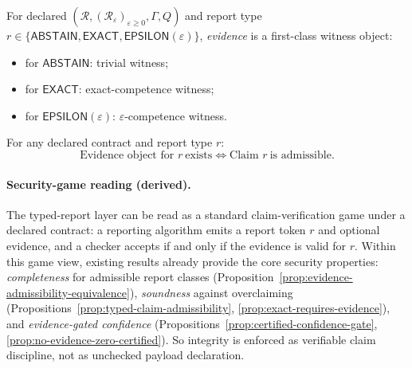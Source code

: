 \begin{definition}\label{def:evidence-object}
For declared $(\mathcal{R},(\mathcal{R}_\varepsilon)_{\varepsilon\ge 0},\Gamma,Q)$ and report type $r\in\{\mathsf{ABSTAIN},\mathsf{EXACT},\mathsf{EPSILON}(\varepsilon)\}$,
\emph{evidence} is a first-class witness object:
\begin{itemize}
\item for $\mathsf{ABSTAIN}$: trivial witness;
\item for $\mathsf{EXACT}$: exact-competence witness;
\item for $\mathsf{EPSILON}(\varepsilon)$: $\varepsilon$-competence witness.
\end{itemize}
\end{definition}

\begin{proposition}\label{prop:evidence-admissibility-equivalence}
For any declared contract and report type $r$:
\[
\text{Evidence object for }r\ \text{exists}
\iff
\text{Claim }r\ \text{is admissible}.
\]
\end{proposition}

\paragraph{Security-game reading (derived).}
The typed-report layer can be read as a standard claim-verification game under a declared contract:
a reporting algorithm emits a report token $r$ and optional evidence, and a checker accepts if and only if the evidence is valid for $r$.
Within this game view, existing results already provide the core security properties:
\emph{completeness} for admissible report classes (Proposition~\ref{prop:evidence-admissibility-equivalence}),
\emph{soundness} against overclaiming (Propositions~\ref{prop:typed-claim-admissibility}, \ref{prop:exact-requires-evidence}),
and \emph{evidence-gated confidence} (Propositions~\ref{prop:certified-confidence-gate}, \ref{prop:no-evidence-zero-certified}).
So integrity is enforced as verifiable claim discipline, not as unchecked payload declaration.

